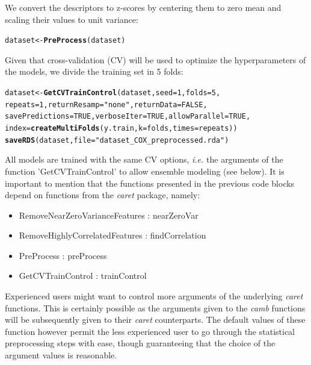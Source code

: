 \documentclass[twoside,a4wide,12pt]{article}\usepackage[]{graphicx}\usepackage[]{color}
\makeatletter
\newcommand{\hlnum}[1]{\textcolor[rgb]{0.686,0.059,0.569}{#1}}%
\newcommand{\hlstr}[1]{\textcolor[rgb]{0.192,0.494,0.8}{#1}}%
\newcommand{\hlstd}[1]{\textcolor[rgb]{0.345,0.345,0.345}{#1}}%
\newcommand{\hlkwb}[1]{\textcolor[rgb]{0.69,0.353,0.396}{#1}}%
\newcommand{\hlkwc}[1]{\textcolor[rgb]{0.333,0.667,0.333}{#1}}%
\newcommand{\hlkwd}[1]{\textcolor[rgb]{0.737,0.353,0.396}{\textbf{#1}}}%
\newenvironment{kframe}{%
 \def\at@end@of@kframe{}%
 \ifinner\ifhmode%
  \def\at@end@of@kframe{\end{minipage}}%
  \begin{minipage}{\columnwidth}%
 \fi\fi%
 \def\FrameCommand##1{\hskip\@totalleftmargin \hskip-\fboxsep
 \colorbox{shadecolor}{##1}\hskip-\fboxsep
     \hskip-\linewidth \hskip-\@totalleftmargin \hskip\columnwidth}%
 \MakeFramed {\advance\hsize-\width
   \@totalleftmargin\z@ \linewidth\hsize
   \@setminipage}}%
 {\par\unskip\endMakeFramed%
 \at@end@of@kframe}
\newenvironment{knitrout}{}{} %
\makeatother
\begin{document}
We convert the descriptors to z-scores by centering them to zero mean and scaling their values to unit variance:
\begin{knitrout}
\color{fgcolor}\begin{kframe}
\begin{alltt}
\hlstd{dataset} \hlkwb{<-} \hlkwd{PreProcess}\hlstd{(dataset)}
\end{alltt}
\end{kframe}
\end{knitrout}

Given that cross-validation (CV) will be used to optimize the hyperparameters of the models, we divide the training set in 5 folds:
\begin{knitrout}
\color{fgcolor}\begin{kframe}
\begin{alltt}
\hlstd{dataset} \hlkwb{<-} \hlkwd{GetCVTrainControl}\hlstd{(dataset,} \hlkwc{seed} \hlstd{=} \hlnum{1}\hlstd{,} \hlkwc{folds} \hlstd{=} \hlnum{5}\hlstd{,}
    \hlkwc{repeats} \hlstd{=} \hlnum{1}\hlstd{,} \hlkwc{returnResamp} \hlstd{=} \hlstr{"none"}\hlstd{,} \hlkwc{returnData} \hlstd{=} \hlnum{FALSE}\hlstd{,}
    \hlkwc{savePredictions} \hlstd{=} \hlnum{TRUE}\hlstd{,} \hlkwc{verboseIter} \hlstd{=} \hlnum{TRUE}\hlstd{,} \hlkwc{allowParallel} \hlstd{=} \hlnum{TRUE}\hlstd{,}
    \hlkwc{index} \hlstd{=} \hlkwd{createMultiFolds}\hlstd{(y.train,} \hlkwc{k} \hlstd{= folds,} \hlkwc{times} \hlstd{= repeats))}
\hlkwd{saveRDS}\hlstd{(dataset,} \hlkwc{file} \hlstd{=} \hlstr{"dataset_COX_preprocessed.rda"}\hlstd{)}
\end{alltt}
\end{kframe}
\end{knitrout}
All models are trained with the same CV options, {\it i.e.} the arguments of the function 'GetCVTrainControl' to allow ensemble modeling (see below).
It is important to mention that the functions presented in the previous code blocks depend on functions from the {\it caret} package, namely: 
\begin{itemize}
\item RemoveNearZeroVarianceFeatures : nearZeroVar
\item RemoveHighlyCorrelatedFeatures : findCorrelation
\item PreProcess : preProcess
\item GetCVTrainControl : trainControl
\end{itemize}
Experienced users might want to control more arguments of the underlying {\it caret} functions.
This is certainly possible as the arguments given to the {\it camb} functions will be subsequently given to their {\it caret} counterparts.
The default values of these function however permit the less experienced user to go through the statistical preprocessing steps with ease, though guaranteeing that the choice of the argument values is reasonable.
\end{document}
